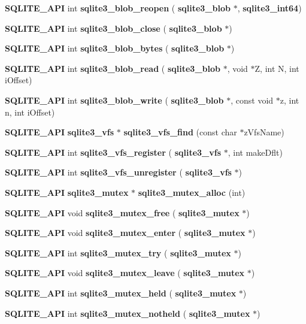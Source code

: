 \begin{DoxyCompactItemize}
\item 
\textbf{ S\+Q\+L\+I\+T\+E\+\_\+\+A\+PI} int \textbf{ sqlite3\+\_\+blob\+\_\+reopen} (\textbf{ sqlite3\+\_\+blob} $\ast$, \textbf{ sqlite3\+\_\+int64})
\item 
\textbf{ S\+Q\+L\+I\+T\+E\+\_\+\+A\+PI} int \textbf{ sqlite3\+\_\+blob\+\_\+close} (\textbf{ sqlite3\+\_\+blob} $\ast$)
\item 
\textbf{ S\+Q\+L\+I\+T\+E\+\_\+\+A\+PI} int \textbf{ sqlite3\+\_\+blob\+\_\+bytes} (\textbf{ sqlite3\+\_\+blob} $\ast$)
\item 
\textbf{ S\+Q\+L\+I\+T\+E\+\_\+\+A\+PI} int \textbf{ sqlite3\+\_\+blob\+\_\+read} (\textbf{ sqlite3\+\_\+blob} $\ast$, void $\ast$Z, int N, int i\+Offset)
\item 
\textbf{ S\+Q\+L\+I\+T\+E\+\_\+\+A\+PI} int \textbf{ sqlite3\+\_\+blob\+\_\+write} (\textbf{ sqlite3\+\_\+blob} $\ast$, const void $\ast$z, int n, int i\+Offset)
\item 
\textbf{ S\+Q\+L\+I\+T\+E\+\_\+\+A\+PI} \textbf{ sqlite3\+\_\+vfs} $\ast$ \textbf{ sqlite3\+\_\+vfs\+\_\+find} (const char $\ast$z\+Vfs\+Name)
\item 
\textbf{ S\+Q\+L\+I\+T\+E\+\_\+\+A\+PI} int \textbf{ sqlite3\+\_\+vfs\+\_\+register} (\textbf{ sqlite3\+\_\+vfs} $\ast$, int make\+Dflt)
\item 
\textbf{ S\+Q\+L\+I\+T\+E\+\_\+\+A\+PI} int \textbf{ sqlite3\+\_\+vfs\+\_\+unregister} (\textbf{ sqlite3\+\_\+vfs} $\ast$)
\item 
\textbf{ S\+Q\+L\+I\+T\+E\+\_\+\+A\+PI} \textbf{ sqlite3\+\_\+mutex} $\ast$ \textbf{ sqlite3\+\_\+mutex\+\_\+alloc} (int)
\item 
\textbf{ S\+Q\+L\+I\+T\+E\+\_\+\+A\+PI} void \textbf{ sqlite3\+\_\+mutex\+\_\+free} (\textbf{ sqlite3\+\_\+mutex} $\ast$)
\item 
\textbf{ S\+Q\+L\+I\+T\+E\+\_\+\+A\+PI} void \textbf{ sqlite3\+\_\+mutex\+\_\+enter} (\textbf{ sqlite3\+\_\+mutex} $\ast$)
\item 
\textbf{ S\+Q\+L\+I\+T\+E\+\_\+\+A\+PI} int \textbf{ sqlite3\+\_\+mutex\+\_\+try} (\textbf{ sqlite3\+\_\+mutex} $\ast$)
\item 
\textbf{ S\+Q\+L\+I\+T\+E\+\_\+\+A\+PI} void \textbf{ sqlite3\+\_\+mutex\+\_\+leave} (\textbf{ sqlite3\+\_\+mutex} $\ast$)
\item 
\textbf{ S\+Q\+L\+I\+T\+E\+\_\+\+A\+PI} int \textbf{ sqlite3\+\_\+mutex\+\_\+held} (\textbf{ sqlite3\+\_\+mutex} $\ast$)
\item 
\textbf{ S\+Q\+L\+I\+T\+E\+\_\+\+A\+PI} int \textbf{ sqlite3\+\_\+mutex\+\_\+notheld} (\textbf{ sqlite3\+\_\+mutex} $\ast$)

\end{DoxyCompactItemize}
